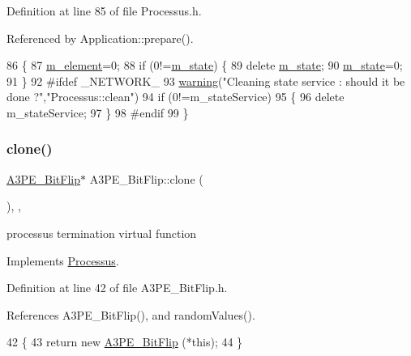 Definition at line 85 of file Processus.\+h.



Referenced by Application\+::prepare().


\begin{DoxyCode}
86   \{
87     \hyperlink{classProcessus_aa9d24d53c3e52f36786cabb5d8e296e7}{m\_element}=0;
88     \textcolor{keywordflow}{if} (0!=\hyperlink{classProcessus_ab3539eee42891ceae0baf4395ae7fb61}{m\_state}) \{
89       \textcolor{keyword}{delete} \hyperlink{classProcessus_ab3539eee42891ceae0baf4395ae7fb61}{m\_state};
90       \hyperlink{classProcessus_ab3539eee42891ceae0baf4395ae7fb61}{m\_state}=0;
91     \}
92 \textcolor{preprocessor}{#ifdef \_NETWORK\_
}
93     \hyperlink{classObject_a65cd4fda577711660821fd2cd5a3b4c9}{warning}(\textcolor{stringliteral}{"Cleaning state service : should it be done ?"},\textcolor{stringliteral}{"Processus::clean"})
94       if (0!=m\_stateService)
95       \{
96         \textcolor{keyword}{delete} m\_stateService;
97       \}
98 \textcolor{preprocessor}{#endif
}
99   \}
\end{DoxyCode}
\mbox{\label{classA3PE__BitFlip_a444f2b4fd5211e457105f13d19795211}} 
\subsubsection{\texorpdfstring{clone()}{clone()}}
{\footnotesize\ttfamily \hyperlink{classA3PE__BitFlip_1_1A3PE__BitFlip}{A3\+P\+E\+\_\+\+Bit\+Flip}$\ast$ A3\+P\+E\+\_\+\+Bit\+Flip\+::clone (\begin{DoxyParamCaption}{ }\end{DoxyParamCaption})\hspace{0.3cm}{\ttfamily [inline]}, {\ttfamily [protected]}, {\ttfamily [virtual]}}

processus termination virtual function 

Implements \hyperlink{classProcessus_aca8856f6d6d7b7e1fe941f298dcbb502}{Processus}.



Definition at line 42 of file A3\+P\+E\+\_\+\+Bit\+Flip.\+h.



References A3\+P\+E\+\_\+\+Bit\+Flip(), and random\+Values().


\begin{DoxyCode}
42                        \{
43     \textcolor{keywordflow}{return} \textcolor{keyword}{new} \hyperlink{classA3PE__BitFlip_a79aca0cefbd433bfb7f0e0cb6bc7abe1}{A3PE\_BitFlip} (*\textcolor{keyword}{this});
44   \}
\end{DoxyCode}
\mbox{\label{classProcessus_a2f3c41e99da4c738ea3d8f7b0d20a665}} 
